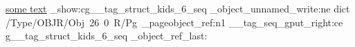 \documentclass{article}
\begin{document}
\href{https//www.blub.de}{some text}
\ExplSyntaxOn
\seq_show:c{g__tag_struct_kids_6_seq}
\pdf_object_unnamed_write:ne
      { dict }
      {
        /Type/OBJR/Obj~26~0~R/Pg~\pdf_pageobject_ref:n{1}
      }
\__tag_seq_gput_right:ce
      { g__tag_struct_kids_6_seq }
      {
        \pdf_object_ref_last:
      }      
\ExplSyntaxOff
\end{document}
